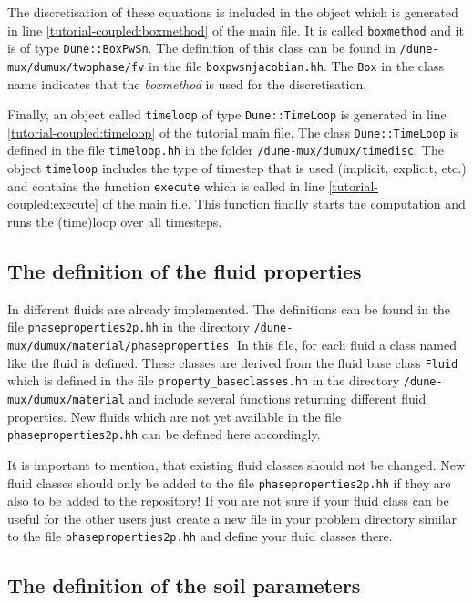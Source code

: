 The discretisation of these equations is included in the object which is generated in line \ref{tutorial-coupled:boxmethod} of the main file. It is called \texttt{boxmethod} and it is of type \texttt{Dune::BoxPwSn}. The definition of this class can be found in \texttt{/dune-mux/dumux/twophase/fv} in the file \texttt{boxpwsnjacobian.hh}. The \texttt{Box} in the class name indicates that the \textit{boxmethod} is used for the discretisation. 

Finally, an object called \texttt{timeloop} of type \texttt{Dune::TimeLoop} is generated in line \ref{tutorial-coupled:timeloop} of the tutorial main file. The class \texttt{Dune::TimeLoop} is defined in the file \texttt{timeloop.hh} in the folder \texttt{/dune-mux/dumux/timedisc}. The object \texttt{timeloop} includes the type of timestep that is used (implicit, explicit, etc.) and contains the function \texttt{execute} which is called in line \ref{tutorial-coupled:execute} of the main file. This function finally starts the computation and runs the (time)loop over all timesteps.

\subsection{The definition of the fluid properties}\label{tutorial-coupled:description-fluid-class}

In \Dumux different fluids are already implemented. The definitions can be found in the file \texttt{phaseproperties2p.hh} in the directory \texttt{/dune-mux/dumux/material/phaseproperties}. In this file, for each fluid a class named like the fluid is defined. These classes are derived from the fluid base class \texttt{Fluid} which is defined in the file \texttt{property\_baseclasses.hh} in the directory \texttt{/dune-mux/dumux/material} and include several functions returning different fluid properties. New fluids which are not yet available in the file \texttt{phaseproperties2p.hh} can be defined here accordingly.

It is important to mention, that existing fluid classes should not be changed. New fluid classes should only be added to the file \texttt{phaseproperties2p.hh} if they are also to be added to the repository! If you are not sure if your fluid class can be useful for the other \Dumux users just create a new file in your problem directory similar to the file \texttt{phaseproperties2p.hh} and define your fluid classes there.

\subsection{The definition of the soil parameters}\label{tutorial-coupled:description-soil-class}

